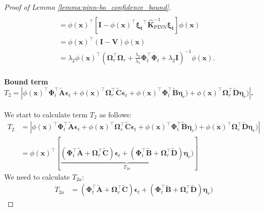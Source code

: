 \begin{proof}[Proof of Lemma \ref{lemma:pinn-bo_confidence_bound}]
\begin{align}
\\ 
            & = \phi(\mathbf{x})^\top \left[\mathbf{I} - \phi(\mathbf{x})^\top \boldsymbol{\boldsymbol{\xi}_t}^\top \mathbf{\widehat{K}}_\mathrm{PINN}^{-1} \boldsymbol{\boldsymbol{\xi}_t}\right] \phi(\mathbf{x}) \nonumber
\\
            & = \phi(\mathbf{x})^\top (\mathbf{I} - \mathbf{V}) \phi(\mathbf{x})  \nonumber
\\
            &  = \lambda_2 \phi(\mathbf{x})^\top\left(\boldsymbol{\Omega}_r^\top\boldsymbol{\Omega}_r+\frac{\lambda_2} {\lambda_1} \boldsymbol{\Phi}_t^\top \boldsymbol{\Phi}_t+ \lambda_2 \mathbf{I}\right)^{-1} \phi(\mathbf{x}). \label{Eqn:sigma_f_by_V}
    \end{align}
    \paragraph{Bound term \\ $T_2=  \left\lvert \phi(\mathbf{x})^\top \boldsymbol{\Phi}_t^\top \widetilde{\mathbf{A}}\boldsymbol{\epsilon}_t +  \phi(\mathbf{x})^\top \boldsymbol{\Omega}_r^\top \widetilde{\mathbf{C}}\boldsymbol{\epsilon}_t +  \phi(\mathbf{x})^\top \boldsymbol{\Phi}_t^\top \widetilde{\mathbf{B}}\boldsymbol{\eta}_r) + \phi(\mathbf{x})^\top \boldsymbol{\Omega}_r^\top \widetilde{\mathbf{D}}\boldsymbol{\eta}_r) \right\rvert$.\\} 
    We start to calculate term $T_2$ as follows:
    \begin{align*}
            T_2 &=\left\lvert \phi(\mathbf{x})^\top \boldsymbol{\Phi}_t^\top \widetilde{\mathbf{A}}\boldsymbol{\epsilon}_t +  \phi(\mathbf{x})^\top \boldsymbol{\Omega}_r^\top \widetilde{\mathbf{C}}\boldsymbol{\epsilon}_t +  \phi(\mathbf{x})^\top \boldsymbol{\Phi}_t^\top \widetilde{\mathbf{B}}\boldsymbol{\eta}_r) + \phi(\mathbf{x})^\top \boldsymbol{\Omega}_r^\top \widetilde{\mathbf{D}}\boldsymbol{\eta}_r) \right\rvert 
\\
            &= \phi(\mathbf{x})^\top\left[\underbrace{(\boldsymbol{\Phi}_t^\top \widetilde{\mathbf{A}} +  \boldsymbol{\Omega}_r^\top \widetilde{\mathbf{C}})\boldsymbol{\epsilon}_t + (\boldsymbol{\Phi}_t^\top\widetilde{\mathbf{B}} + \boldsymbol{\Omega}_r^\top\widetilde{\mathbf{D}}) \boldsymbol{\eta}_r)}_{T_{2a}} \right] 
    \end{align*}
   We need to calculate $T_{2a}$:
   \begin{align*}
       T_{2a} &= (\boldsymbol{\Phi}_t^\top \widetilde{\mathbf{A}} +  \boldsymbol{\Omega}_r^\top \widetilde{\mathbf{C}})\boldsymbol{\epsilon}_t + (\boldsymbol{\Phi}_t^\top\widetilde{\mathbf{B}} + \boldsymbol{\Omega}_r^\top\widetilde{\mathbf{D}}) \boldsymbol{\eta}_r) 

\end{align*}
\end{proof}
